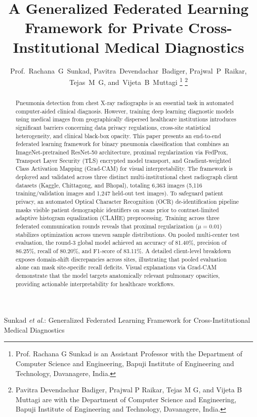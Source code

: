 \documentclass[journal]{IEEEtran}
\begin{document}
\title{A Generalized Federated Learning Framework for Private Cross-Institutional Medical Diagnostics}

\author{Prof.~Rachana~G~Sunkad,
        Pavitra~Devendachar~Badiger,
        Prajwal~P~Raikar,
        Tejas~M~G,
        and~Vijeta~B~Muttagi%
\thanks{Prof. Rachana G Sunkad is an Assistant Professor with the Department of Computer Science and Engineering, Bapuji Institute of Engineering and Technology, Davanagere, India.}%
\thanks{Pavitra Devendachar Badiger, Prajwal P Raikar, Tejas M G, and Vijeta B Muttagi are with the Department of Computer Science and Engineering, Bapuji Institute of Engineering and Technology, Davanagere, India.}%
}

%
{Sunkad \MakeLowercase{\textit{et al.}}: Generalized Federated Learning Framework for Cross-Institutional Medical Diagnostics}

\maketitle

\begin{abstract}
Pneumonia detection from chest X-ray radiographs is an essential task in automated computer-aided clinical diagnosis. However, training deep learning diagnostic models using medical images from geographically dispersed healthcare institutions introduces significant barriers concerning data privacy regulations, cross-site statistical heterogeneity, and clinical black-box opacity. This paper presents an end-to-end federated learning framework for binary pneumonia classification that combines an ImageNet-pretrained ResNet-50 architecture, proximal regularization via FedProx, Transport Layer Security (TLS) encrypted model transport, and Gradient-weighted Class Activation Mapping (Grad-CAM) for visual interpretability. The framework is deployed and validated across three distinct multi-institutional chest radiograph client datasets (Kaggle, Chittagong, and Bhopal), totaling 6,363 images (5,116 training/validation images and 1,247 held-out test images). To safeguard patient privacy, an automated Optical Character Recognition (OCR) de-identification pipeline masks visible patient demographic identifiers on scans prior to contrast-limited adaptive histogram equalization (CLAHE) preprocessing. Training across three federated communication rounds reveals that proximal regularization ($\mu = 0.01$) stabilizes optimization across uneven sample distributions. On pooled multi-center test evaluation, the round-3 global model achieved an accuracy of 81.40\%, precision of 86.25\%, recall of 80.20\%, and F1-score of 83.11\%. A detailed client-level breakdown exposes domain-shift discrepancies across sites, illustrating that pooled evaluation alone can mask site-specific recall deficits. Visual explanations via Grad-CAM demonstrate that the model targets anatomically relevant pulmonary opacities, providing actionable interpretability for healthcare workflows.
\end{abstract}
\end{document}
